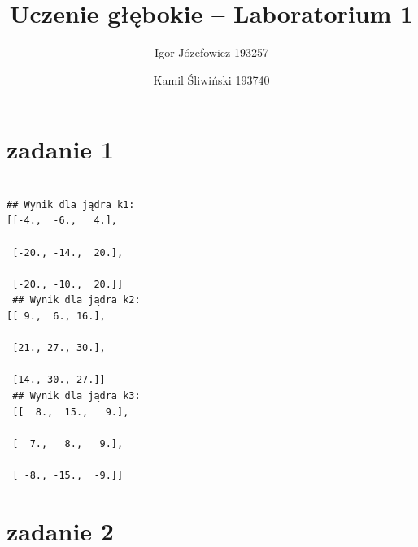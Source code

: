 \documentclass[12pt]{article}
\begin{document}
\rhead{\today}
\title{Uczenie głębokie -- Laboratorium 1 }
\author{Igor Józefowicz 193257\and Kamil Śliwiński 193740}
\maketitle


\section{zadanie 1}

\begin{verbatim}

## Wynik dla jądra k1:
[[-4.,  -6.,   4.],

 [-20., -14.,  20.],

 [-20., -10.,  20.]]
 ## Wynik dla jądra k2:
[[ 9.,  6., 16.],

 [21., 27., 30.],

 [14., 30., 27.]]
 ## Wynik dla jądra k3:
 [[  8.,  15.,   9.],

 [  7.,   8.,   9.],

 [ -8., -15.,  -9.]]

\end{verbatim}



\section{zadanie 2}
\end{document}
